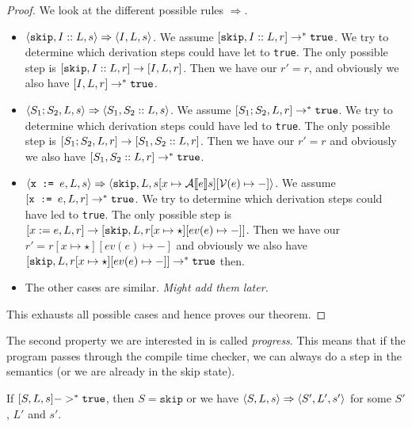 \begin{proof}
We look at the different possible rules $\Rightarrow$. 
\begin{itemize}
    \item $\langle \texttt{skip}, I::L, s \rangle \Rightarrow \langle I, L, s \rangle$. We assume $[ \texttt{skip}, I::L, r ] \to ^* \texttt{true}$. We try to determine which derivation steps could have let to \texttt{true}. The only possible step is $[ \texttt{skip}, I::L, r ]\to [ I, L, r ]$. Then we have our $r' = r$, and obviously we also have $[ I, L, r ] \to^* \texttt{true}$.
    \item $\langle S_1; S_2, L, s \rangle \Rightarrow \langle S_1, S_2::L, s \rangle$. We assume $[ S_1; S_2, L, r ] \to ^* \texttt{true}$. We try to determine which derivation steps could have led to \texttt{true}. The only possible step is $[ S_1; S_2, L, r ] \to [ S_1, S_2::L, r ]$. Then we have our $r' = r$ and obviously we also have $[ S_1, S_2::L, r ] \to^* \texttt{true}$.
    \item $\langle \texttt{x := } e, L, s \rangle \Rightarrow \langle \texttt{skip}, L, s[x \mapsto \mathcal{A} \llbracket e \rrbracket s][\mathcal{V}(e)\mapsto-] \rangle$. We assume $[ \texttt{x := } e, L, r ] \to ^* \texttt{true}$. We try to determine which derivation steps could have led to \texttt{true}. The only possible step is $[ x:=e, L, r ] \to [ \texttt{skip}, L, r[x\mapsto \star][ev(e) \mapsto -] ]$. Then we have our $r' = r[x\mapsto \star][ev(e) \mapsto -]$ and obviously we also have $[ \texttt{skip}, L, r[x\mapsto \star][ev(e) \mapsto -] ] \to^* \texttt{true}$ then.
    \item The other cases are similar. \emph{Might add them later.}
\end{itemize}
This exhausts all possible cases and hence proves our theorem.
\end{proof}

The second property we are interested in is called \emph{progress}. This means that if the program passes through the compile time checker, we can always do a step in the semantics (or we are already in the skip state). %

\begin{theorem}
If $[ S, L, s ] ->^* \texttt{true}$, then $S = \texttt{skip}$ or we have $\langle S, L, s \rangle \Rightarrow \langle S', L', s' \rangle$ for some $S'$, $L'$ and $s'$.
\end{theorem}

